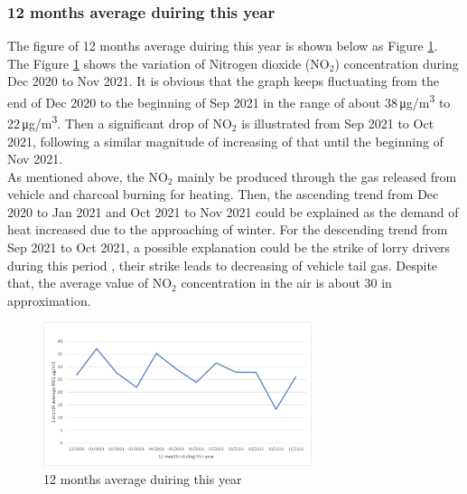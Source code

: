 \documentclass[a4paper,12pt,reqno]{article}
\begin{document}
    \subsubsection*{12 months average duiring this year}
        The figure of 12 months average duiring this year is shown below 
        as Figure \ref{fig:12_months_average_duiring_this_year}.\\
        The Figure \ref{fig:12_months_average_duiring_this_year} shows the variation of Nitrogen dioxide (NO$_2$) 
        concentration during Dec 2020 to Nov 2021. It is obvious 
        that the graph keeps fluctuating from the end of Dec 2020 
        to the beginning of Sep 2021 in the range of about 38\,\si{\ug/\m^3} 
        to 22\,\si{\ug/\m^3}. Then a significant drop of NO$_2$ is illustrated 
        from Sep 2021 to Oct 2021, following a similar magnitude of 
        increasing of that until the beginning of Nov 2021. \\
        As mentioned above, the NO$_2$ mainly be produced through the 
        gas released from vehicle and charcoal burning for heating. 
        Then, the ascending trend from Dec 2020 to Jan 2021 and 
        Oct 2021 to Nov 2021 could be explained as the demand of 
        heat increased due to the approaching of winter. For the 
        descending trend from Sep 2021 to Oct 2021, a possible 
        explanation could be the strike of lorry drivers during 
        this period \cite{Gareth}, their strike leads to decreasing of 
        vehicle tail gas. Despite that, the average value of NO$_2$ 
        concentration in the air is about 30 in approximation.
        \begin{figure}[H]
            \centering
            \includegraphics[width=0.7\textwidth]{figures/figure1.png}
            \caption{12 months average duiring this year}
            \label{fig:12_months_average_duiring_this_year}
        \end{figure}
         
\end{document}
